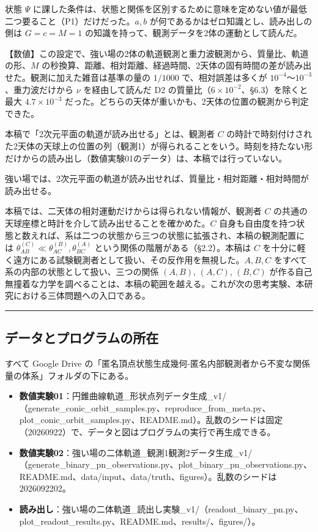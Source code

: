 \documentclass[
  a4paper,
]{ltjsarticle}
\providecommand{\tightlist}{%
  \setlength{\itemsep}{0pt}\setlength{\parskip}{0pt}}
\begin{document}
状態 \(\Psi\)
に課した条件は、状態と関係を区別するために意味を定めない値が最低二つ要ること（P1）だけだった。\(a, b\)
が何であるかはゼロ知識とし、読み出しの側は \(G=c=M=1\)
の知識を持って、観測データを2体の運動として読んだ。

【数値】この設定で、強い場の2体の軌道観測と重力波観測から、質量比、軌道の形、\(M\)
の秒換算、距離、相対距離、経過時間、2天体の固有時間の差が読み出せた。観測に加えた雑音は基準の量の
\(1/1000\) で、相対誤差は多くが \(10^{-4}\)〜\(10^{-3}\)、重力波だけから
\(\nu\) を経由して読んだ D2
の質量比（\(6\times10^{-2}\)、§6.3）を除くと最大 \(4.7\times10^{-3}\)
だった。どちらの天体が重いかも、2天体の位置の観測から判定できた。

本稿で「2次元平面の軌道が読み出せる」とは、観測者 \(C\)
の時計で時刻付けされた2天体の天球上の位置の列（観測1）が得られることをいう。時刻を持たない形だけからの読み出し（数値実験01のデータ）は、本稿では行っていない。

強い場では、2次元平面の軌道が読み出せれば、質量比・相対距離・相対時間が読み出せる。

本稿では、二天体の相対運動だけからは得られない情報が、観測者 \(C\)
の共通の天球座標と時計を介して読み出せることを確かめた。\(C\)
自身も自由度を持つ状態と数えれば、系は二つの状態から三つの状態に拡張され、本稿の観測配置には
\(\theta_{AB}^{(C)}\ll\theta_{AC}^{(B)},\theta_{BC}^{(A)}\)
という関係の階層がある（§2.2）。本稿は \(C\)
を十分に軽く遠方にある試験観測者として扱い、その反作用を無視した。\(A, B, C\)
をすべて系の内部の状態として扱い、三つの関係 \((A,B)\), \((A,C)\),
\((B,C)\)
が作る自己無撞着な力学を調べることは、本稿の範囲を越える。これが次の思考実験、本研究における三体問題への入口である。

\begin{center}\rule{0.5\linewidth}{0.5pt}\end{center}

\subsection{データとプログラムの所在}\label{ux30c7ux30fcux30bfux3068ux30d7ux30edux30b0ux30e9ux30e0ux306eux6240ux5728}

すべて Google Drive
の「匿名頂点状態生成幾何-匿名内部観測者から不変な関係量の体系」フォルダの下にある。

\begin{itemize}
\tightlist
\item
  \textbf{数値実験01}：円錐曲線軌道\_形状点列データ生成\_v1/（generate\_conic\_orbit\_samples.py、reproduce\_from\_meta.py、plot\_conic\_orbit\_samples.py、README.md）。乱数のシードは固定（20260922）で、データと図はプログラムの実行で再生成できる。
\item
  \textbf{数値実験02}：強い場の二体軌道\_観測1観測2データ生成\_v1/（generate\_binary\_pn\_observations.py、plot\_binary\_pn\_observations.py、README.md、data/input、data/truth、figures）。乱数のシードは
  2026092202。
\item
  \textbf{読み出し}：強い場の二体軌道\_読出し実験\_v1/（readout\_binary\_pn.py、plot\_readout\_results.py、README.md、results/、figures/）。
\end{itemize}
\end{document}
